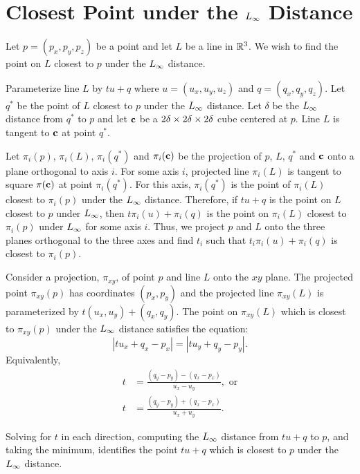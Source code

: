 
\appendix

\section{Closest Point under the $L_\infty$ Distance}
\label{appendix:Linf}

Let $p = (p_x, p_y, p_z)$ be a point and let $L$ be a line in $\mathbb{R}^{3}$.
We wish to find the point on $L$ closest to $p$ under the $L_\infty$ distance.

Parameterize line $L$ by $t u + q$
where $u = (u_x, u_y, u_z)$ and $q = (q_x, q_y, q_z)$.
Let $q^*$ be the point of $L$ closest to $p$ under the $L_\infty$ distance.
Let $\delta$ be the $L_\infty$ distance from $q^*$ to $p$
and let $\mathbf{c}$ be a $2\delta \times 2\delta \times 2\delta$ cube centered at $p$.
Line $L$ is tangent to $\mathbf{c}$ at point $q^*$.

Let $\pi_i(p)$, $\pi_i(L)$, $\pi_i(q^*)$ and $\pi_i(\mathbf{c})$
be the projection of $p$, $L$, $q^*$ and $\mathbf{c}$
onto a plane orthogonal to axis $i$.
For some axis $i$,
projected line $\pi_i(L)$ is tangent to square $\pi(\mathbf{c})$
at point $\pi_i(q^*)$.
For this axis, $\pi_i(q^*)$ is the point of $\pi_i(L)$
closest to $\pi_i(p)$ under the $L_\infty$ distance.
Therefore, if $tu+q$ is the point on $L$ closest to $p$ under $L_\infty$,
then $t \pi_i(u) + \pi_i(q)$ is the point 
on $\pi_i(L)$ closest to $\pi_i(p)$ under $L_\infty$ for some axis $i$.
Thus, we project $p$ and $L$ onto the three planes orthogonal 
to the three axes and find $t_i$ such that $t_i \pi_i(u) + \pi_i(q)$
is closest to $\pi_i(p)$.

Consider a projection, $\pi_{xy}$, 
of point $p$ and line $L$ onto the $xy$ plane.
The projected point $\pi_{xy}(p)$ has coordinates $(p_x,p_y)$
and the projected line $\pi_{xy}(L)$ is parameterized 
by $t(u_x,u_y) + (q_x,q_y)$.
The point on $\pi_{xy}(L)$ which is closest to $\pi_{xy}(p)$
under the $L_\infty$ distance satisfies the equation:
\begin{equation*}
|t u_x + q_x - p_x| = |t u_y + q_y - p_y|.
\end{equation*}
Equivalently,
\begin{align*}
t & = \frac{(q_y-p_y)-(q_x-p_x)}{u_x-u_y}, \mbox{ or} \\
t & = \frac{(q_y-p_y)+(q_x-p_x)}{u_x+u_y}.
\end{align*}

Solving for $t$ in each direction,
computing the $L_\infty$ distance from $t u + q$ to $p$,
and taking the minimum,
identifies the point $t u + q$ which is closest to $p$
under the $L_\infty$ distance.
